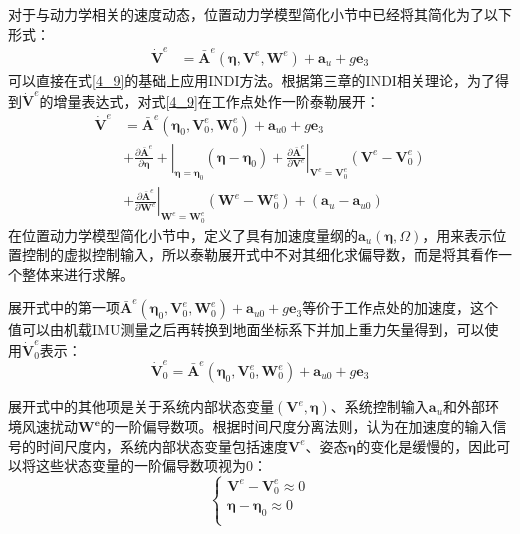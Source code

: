 对于与动力学相关的速度动态，位置动力学模型简化小节中已经将其简化为了以下形式：
\begin{equation}
    \begin{aligned}
        \dot{\boldsymbol{V}}^e&=
        \bar{\boldsymbol{A}}^e(\boldsymbol{\eta},\boldsymbol{V}^e,\boldsymbol{W}^e)+\boldsymbol{a}_u+g\boldsymbol{e}_3
    \end{aligned}
    \label{4_9}
\end{equation}
可以直接在式\eqref{4_9}的基础上应用INDI方法。根据第三章的INDI相关理论，为了得到$\boldsymbol{\dot{V}}^e$的增量表达式，对式\eqref{4_9}在工作点处作一阶泰勒展开：
\begin{equation}
    \begin{aligned}
        \boldsymbol{\dot{V}}^e&=\bar{\boldsymbol{A}}^e(\boldsymbol{\eta}_0,\boldsymbol{V}^e_0,\boldsymbol{W}^e_0)+\boldsymbol{a}_{u0}+g\boldsymbol{e}_3\\
        &+\left.\frac{\partial \bar{\boldsymbol{A}}^e}{\partial\boldsymbol{\eta}}+\right|_{\boldsymbol{\eta}=\boldsymbol{\eta}_0}
        (\boldsymbol{\eta}-\boldsymbol{\eta}_0)+\left.\frac{\partial \bar{\boldsymbol{A}}^e}{\partial\boldsymbol{V}^e}\right|_{\boldsymbol{V}^e=\boldsymbol{V}^e_0}
        (\boldsymbol{V}^e-\boldsymbol{V}^e_0)\\
        &+\left.\frac{\partial \bar{\boldsymbol{A}}^e}{\partial\boldsymbol{W}^e}\right|_{\boldsymbol{W}^e=\boldsymbol{W}^e_0}(\boldsymbol{W}^e-\boldsymbol{W}^e_0)+(\boldsymbol{a}_{u}-\boldsymbol{a}_{u0})
    \end{aligned}
    \label{4_10}
\end{equation}
在位置动力学模型简化小节中，定义了具有加速度量纲的$\boldsymbol{a}_u(\boldsymbol{\eta},\Omega)$，用来表示位置控制的虚拟控制输入，所以泰勒展开式中不对其细化求偏导数，而是将其看作一个整体来进行求解。

展开式中的第一项$\bar{\boldsymbol{A}}^e(\boldsymbol{\eta}_0,\boldsymbol{V}^e_0,\boldsymbol{W}^e_0)+\boldsymbol{a}_{u0}+g\boldsymbol{e}_3$等价于工作点处的加速度，这个值可以由机载IMU测量之后再转换到地面坐标系下并加上重力矢量得到，可以使用$\dot{\boldsymbol{V}}^e_0$表示：
\begin{equation}
        \dot{\boldsymbol{V}}^e_0=\bar{\boldsymbol{A}}^e(\boldsymbol{\eta}_0,\boldsymbol{V}^e_0,\boldsymbol{W}^e_0)+\boldsymbol{a}_{u0}+g\boldsymbol{e}_3
    \label{4_11}
\end{equation}

展开式中的其他项是关于系统内部状态变量$(\boldsymbol{V}^e,\boldsymbol{\eta})$、系统控制输入$\boldsymbol{a}_{u}$和外部环境风速扰动$\boldsymbol{W^e}$的一阶偏导数项。根据时间尺度分离法则，认为在加速度的输入信号的时间尺度内，系统内部状态变量包括速度$\boldsymbol{V}^e$、姿态$\boldsymbol{\eta}$的变化是缓慢的，因此可以将这些状态变量的一阶偏导数项视为0：
\begin{equation}
    \begin{cases}
        \boldsymbol{V}^e-\boldsymbol{V}_0^e\approx0 \\
        \boldsymbol{\eta}-\boldsymbol{\eta}_0\approx0 \\
    \end{cases}
    \label{4_12}
\end{equation}

